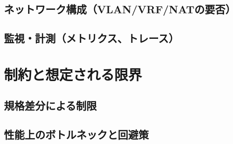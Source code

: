 \subsection{ネットワーク構成（VLAN/VRF/NATの要否）}
\subsection{監視・計測（メトリクス、トレース）}

\section{制約と想定される限界}
\subsection{規格差分による制限}
\subsection{性能上のボトルネックと回避策}
